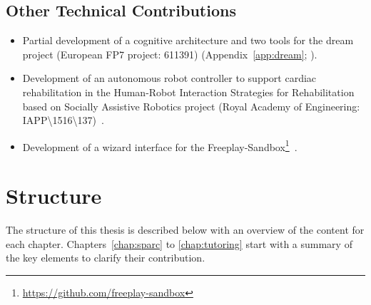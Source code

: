 \subsection{Other Technical Contributions}
\begin{itemize}
	\item Partial development of a cognitive architecture and two tools for the \acrshort{dream} project (European FP7 project: 611391) (Appendix~\ref{app:dream}; \citealt{esteban2017build}).
	\item Development of an autonomous robot controller to support cardiac rehabilitation in the Human-Robot Interaction Strategies for Rehabilitation based on Socially Assistive Robotics project (Royal Academy of Engineering: IAPP\textbackslash1516\textbackslash137)~\citep{lara2017human,casas2018social}.
	\item Development of a wizard interface for the Freeplay-Sandbox\footnote{\url{https://github.com/freeplay-sandbox}}~\citep{lemaignan2017free,wallbridge2018spatial}.
\end{itemize}
	
\section{Structure}\label{sec:intro_struct}

The structure of this thesis is described below with an overview of the content for each chapter. Chapters~\ref{chap:sparc} to \ref{chap:tutoring} start with a summary of the key elements to clarify their contribution.

